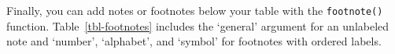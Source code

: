 \documentclass[
  letterpaper,
  DIV=11,
  numbers=noendperiod]{scrartcl}
\begin{document}
\begin{table}

\caption{\label{tbl-grouping-collapse}}


\end{table}%

Finally, you can add notes or footnotes below your table with the
\texttt{footnote()} function. Table~\ref{tbl-footnotes} includes the
`general' argument for an unlabeled note and `number', `alphabet', and
`symbol' for footnotes with ordered labels.
\end{document}
